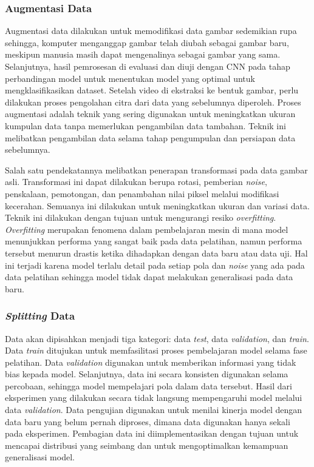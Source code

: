 \subsubsection{Augmentasi Data}

   Augmentasi data dilakukan untuk memodifikasi data gambar sedemikian rupa sehingga, komputer menganggap gambar telah diubah sebagai gambar baru, meskipun manusia masih dapat mengenalinya sebagai gambar yang sama. Selanjutnya, hasil pemrosesan di evaluasi dan diuji dengan CNN pada tahap perbandingan model untuk menentukan model yang optimal untuk mengklasifikasikan dataset.
   Setelah video di ekstraksi ke bentuk gambar, perlu dilakukan proses pengolahan citra dari data yang sebelumnya diperoleh. Proses augmentasi adalah teknik yang sering digunakan untuk meningkatkan ukuran kumpulan data tanpa memerlukan pengambilan data tambahan. Teknik ini melibatkan pengambilan data selama tahap pengumpulan dan persiapan data sebelumnya. 
   
   Salah satu pendekatannya melibatkan penerapan transformasi pada data gambar asli. Transformasi ini dapat dilakukan berupa rotasi, pemberian \textit{noise}, penskalaan, pemotongan, dan penambahan nilai piksel melalui modifikasi kecerahan. Semuanya ini dilakukan untuk meningkatkan ukuran dan variasi data. Teknik ini dilakukan dengan tujuan untuk mengurangi resiko \textit{overfitting}. \textit{Overfitting} merupakan fenomena dalam pembelajaran mesin di mana model menunjukkan performa yang sangat baik pada data pelatihan, namun performa tersebut menurun drastis ketika dihadapkan dengan data baru atau data uji. Hal ini terjadi karena model terlalu detail pada setiap pola dan \textit{noise} yang ada pada data pelatihan sehingga model tidak dapat melakukan generalisasi pada data baru.

\subsubsection{\textit{Splitting} Data}
   Data akan dipisahkan menjadi tiga kategori: data \textit{test}, data \textit{validation}, dan \textit{train}. Data \textit{train} ditujukan untuk memfasilitasi proses pembelajaran model selama fase pelatihan. Data \textit{validation} digunakan untuk memberikan informasi yang tidak bias kepada model. Selanjutnya, data ini secara konsisten digunakan selama percobaan, sehingga model mempelajari pola dalam data tersebut. Hasil dari eksperimen yang dilakukan secara tidak langsung mempengaruhi model melalui data \textit{validation}. 
   Data pengujian digunakan untuk menilai kinerja model dengan data baru yang belum pernah diproses, dimana data digunakan hanya sekali pada eksperimen. Pembagian data ini diimplementasikan dengan tujuan untuk mencapai distribusi yang seimbang dan untuk mengoptimalkan kemampuan generalisasi model.

